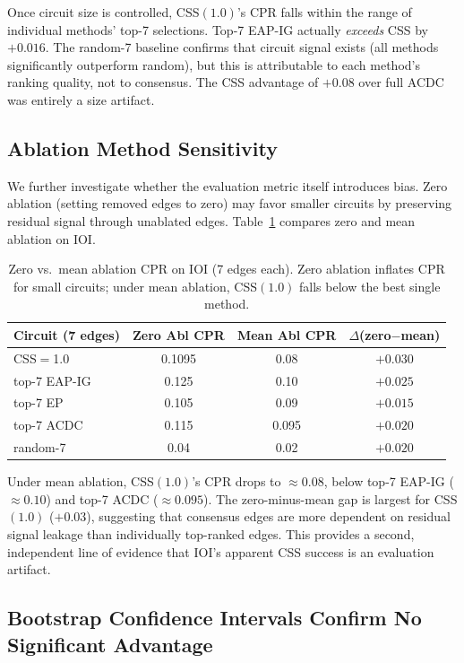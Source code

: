 \documentclass[11pt,a4paper]{article}
\begin{document}
Once circuit size is controlled, CSS$(1.0)$'s CPR falls within the range of individual methods' top-7 selections. Top-7 EAP-IG actually \emph{exceeds} CSS by $+0.016$. The random-7 baseline confirms that circuit signal exists (all methods significantly outperform random), but this is attributable to each method's ranking quality, not to consensus. The CSS advantage of $+0.08$ over full ACDC was entirely a size artifact.

\subsection{Ablation Method Sensitivity}
\label{sec:ablation_method}

We further investigate whether the evaluation metric itself introduces bias. Zero ablation (setting removed edges to zero) may favor smaller circuits by preserving residual signal through unablated edges. Table~\ref{tab:ablation} compares zero and mean ablation on IOI.

\begin{table}[t]
\centering
\small
\caption{Zero vs.\ mean ablation CPR on IOI (7 edges each). Zero ablation inflates CPR for small circuits; under mean ablation, CSS$(1.0)$ falls below the best single method.}
\label{tab:ablation}
\begin{tabular}{lccc}
\toprule
\textbf{Circuit (7 edges)} & \textbf{Zero Abl CPR} & \textbf{Mean Abl CPR} & \textbf{$\Delta$(zero$-$mean)} \\
\midrule
CSS$=$1.0    & 0.1095 & 0.08  & $+0.030$ \\
top-7 EAP-IG & 0.125  & 0.10  & $+0.025$ \\
top-7 EP     & 0.105  & 0.09  & $+0.015$ \\
top-7 ACDC   & 0.115  & 0.095 & $+0.020$ \\
random-7     & 0.04   & 0.02  & $+0.020$ \\
\bottomrule
\end{tabular}
\end{table}

Under mean ablation, CSS$(1.0)$'s CPR drops to ${\approx}0.08$, below top-7 EAP-IG (${\approx}0.10$) and top-7 ACDC (${\approx}0.095$). The zero-minus-mean gap is largest for CSS$(1.0)$ ($+0.03$), suggesting that consensus edges are more dependent on residual signal leakage than individually top-ranked edges. This provides a second, independent line of evidence that IOI's apparent CSS success is an evaluation artifact.

\subsection{Bootstrap Confidence Intervals Confirm No Significant Advantage}
\label{sec:bootstrap}
\end{document}
